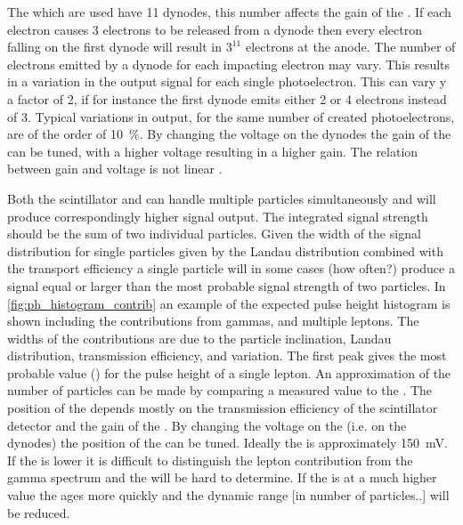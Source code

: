 The \pmts which are used have 11 dynodes, this number affects the gain of the \pmt. If each electron causes \num{3} electrons to be released from a dynode then every electron falling on the first dynode will result in $3^11$ electrons at the anode. The number of electrons emitted by a dynode for each impacting electron may vary. This results in a variation in the output signal for each single photoelectron. This can vary  y a factor of 2, if for instance the first dynode emits either 2 or 4 electrons instead of 3. Typical variations in output, for the same number of created photoelectrons, are of the order of \SI{10}{\percent}. By changing the voltage on the dynodes the gain of the \pmt can be tuned, with a higher voltage resulting in a higher gain. The relation between gain and voltage is not linear \cite{hamamatsu2007handbook}.

Both the scintillator and \pmt can handle multiple particles simultaneously and will produce correspondingly higher signal output. The integrated signal strength should be the sum of two individual particles. Given the width of the signal distribution for single particles given by the Landau distribution combined with the transport efficiency a single particle will in some cases (how often?) produce a signal equal or larger than the most probable signal strength of two particles. In \cref{fig:ph_histogram_contrib} an example of the expected pulse height histogram is shown including the contributions from gammas, and multiple leptons. The widths of the contributions are due to the particle inclination, Landau distribution, transmission efficiency, and \pmt variation. The first peak gives the most probable value (\mpv) for the pulse height of a single lepton. An approximation of the number of particles can be made by comparing a measured value to the \mpv. The position of the \mpv depends mostly on the transmission efficiency of the scintillator detector and the gain of the \pmt. By changing the voltage on the \pmt (i.e. on the dynodes) the position of the \mpv can be tuned. Ideally the \mpv is approximately \SI{150}{\mV}. If the \mpv is lower it is difficult to distinguish the lepton contribution from the gamma spectrum and the \mpv will be hard to determine. If the \mpv is at a much higher value the \pmt ages more quickly and the dynamic range [in number of particles..] will be reduced.

